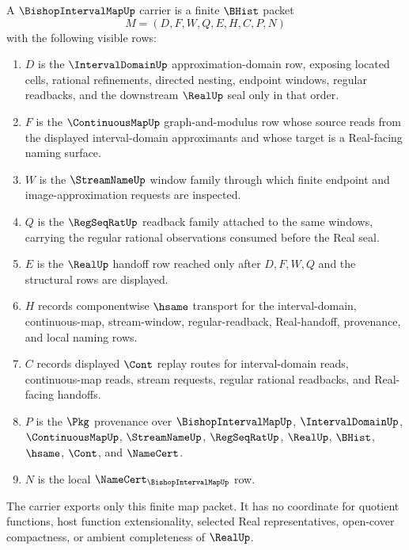 \begin{definition}
\label{def:bishop-interval-map-carrier}
A $\BishopIntervalMapUp$ carrier is a finite $\BHist$ packet
$$
M=(D,F,W,Q,E,H,C,P,N)
$$
with the following visible rows:
\begin{enumerate}
\item $D$ is the $\IntervalDomainUp$ approximation-domain row, exposing located cells, rational refinements, directed nesting, endpoint windows, regular readbacks, and the downstream $\RealUp$ seal only in that order.
\item $F$ is the $\ContinuousMapUp$ graph-and-modulus row whose source reads from the displayed interval-domain approximants and whose target is a Real-facing naming surface.
\item $W$ is the $\StreamNameUp$ window family through which finite endpoint and image-approximation requests are inspected.
\item $Q$ is the $\RegSeqRatUp$ readback family attached to the same windows, carrying the regular rational observations consumed before the Real seal.
\item $E$ is the $\RealUp$ handoff row reached only after $D,F,W,Q$ and the structural rows are displayed.
\item $H$ records componentwise $\hsame$ transport for the interval-domain, continuous-map, stream-window, regular-readback, Real-handoff, provenance, and local naming rows.
\item $C$ records displayed $\Cont$ replay routes for interval-domain reads, continuous-map reads, stream requests, regular rational readbacks, and Real-facing handoffs.
\item $P$ is the $\Pkg$ provenance over $\BishopIntervalMapUp$, $\IntervalDomainUp$, $\ContinuousMapUp$, $\StreamNameUp$, $\RegSeqRatUp$, $\RealUp$, $\BHist$, $\hsame$, $\Cont$, and $\NameCert$.
\item $N$ is the local $\NameCert_{\BishopIntervalMapUp}$ row.
\end{enumerate}
The carrier exports only this finite map packet. It has no coordinate for quotient functions, host function extensionality, selected Real representatives, open-cover compactness, or ambient completeness of $\RealUp$.
\end{definition}


